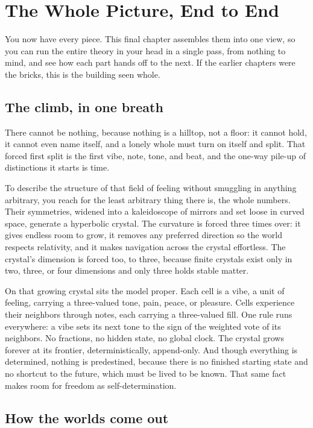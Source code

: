 \section{The Whole Picture, End to End}

You now have every piece. This final chapter assembles them into one view, so you can run the entire theory in your head in a single pass, from nothing to mind, and see how each part hands off to the next. If the earlier chapters were the bricks, this is the building seen whole.

\subsection{The climb, in one breath}

There cannot be nothing, because nothing is a hilltop, not a floor: it cannot hold, it cannot even name itself, and a lonely whole must turn on itself and split. That forced first split is the first vibe, note, tone, and beat, and the one-way pile-up of distinctions it starts is time.

To describe the structure of that field of feeling without smuggling in anything arbitrary, you reach for the least arbitrary thing there is, the whole numbers. Their symmetries, widened into a kaleidoscope of mirrors and set loose in curved space, generate a hyperbolic crystal. The curvature is forced three times over: it gives endless room to grow, it removes any preferred direction so the world respects relativity, and it makes navigation across the crystal effortless. The crystal's dimension is forced too, to three, because finite crystals exist only in two, three, or four dimensions and only three holds stable matter.

On that growing crystal sits the model proper. Each cell is a vibe, a unit of feeling, carrying a three-valued tone, pain, peace, or pleasure. Cells experience their neighbors through notes, each carrying a three-valued fill. One rule runs everywhere: a vibe sets its next tone to the sign of the weighted vote of its neighbors. No fractions, no hidden state, no global clock. The crystal grows forever at its frontier, deterministically, append-only. And though everything is determined, nothing is predestined, because there is no finished starting state and no shortcut to the future, which must be lived to be known. That same fact makes room for freedom as self-determination.

\subsection{How the worlds come out}

